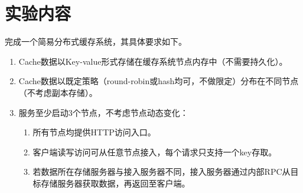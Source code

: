 \section{实验内容}

完成一个简易分布式缓存系统，其具体要求如下。

\begin{enumerate}
    \item Cache数据以Key-value形式存储在缓存系统节点内存中（不需要持久化）。
    \item Cache数据以既定策略（round-robin或hash均可，不做限定）分布在不同节点（不考虑副本存储）。
    \item 服务至少启动3个节点，不考虑节点动态变化：
    \begin{enumerate}
        \item 所有节点均提供HTTP访问入口。
        \item 客户端读写访问可从任意节点接入，每个请求只支持一个key存取。
        \item 若数据所在存储服务器与接入服务器不同，接入服务器通过内部RPC从目标存储服务器获取数据，再返回至客户端。
    \end{enumerate}
\end{enumerate}